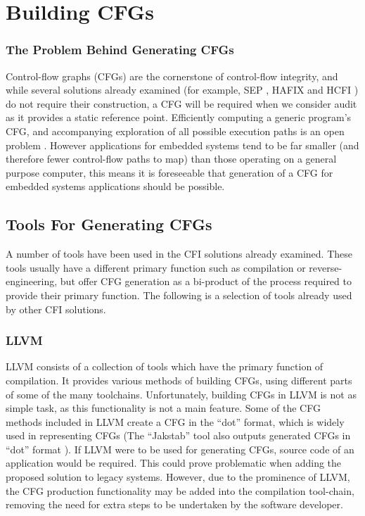 \section{Building CFGs}

\subsubsection*{The Problem Behind Generating CFGs}

Control-flow graphs (CFGs) are the cornerstone of control-flow integrity, and while several solutions already examined (for example, SEP \cite{Lee2019}, HAFIX \cite{Davi2015} and HCFI \cite{Danger2018}) do not require their construction, a CFG will be required when we consider audit as it provides a static reference point. Efficiently computing a generic program's CFG, and accompanying exploration of all possible execution paths is an open problem \cite{Abera2016}. However applications for embedded systems tend to be far smaller (and therefore fewer control-flow paths to map) than those operating on a general purpose computer, this means it is foreseeable that generation of a CFG for embedded systems applications should be possible.

\subsection{Tools For Generating CFGs}

A number of tools have been used in the CFI solutions already examined. These tools usually have a different primary function such as compilation or reverse-engineering, but offer CFG generation as a bi-product of the process required to provide their primary function. The following is a selection of tools already used by other CFI solutions.

\subsubsection*{LLVM}

LLVM \cite{LLVM:CGO04} consists of a collection of tools which have the primary function of compilation. It provides various methods of building CFGs, using different parts of some of the many toolchains. Unfortunately, building CFGs in LLVM is not as simple task, as this functionality is not a main feature. Some of the CFG methods included in LLVM create a CFG in the ``dot'' format, which is widely used in representing CFGs (The ``Jakstab'' tool also outputs generated CFGs in ``dot'' format \cite{Kinder2008}). If LLVM were to be used for generating CFGs, source code of an application would be required. This could prove problematic when adding the proposed solution to legacy systems. However, due to the prominence of LLVM, the CFG production functionality may be added into the compilation tool-chain, removing the need for extra steps to be undertaken by the software developer.

